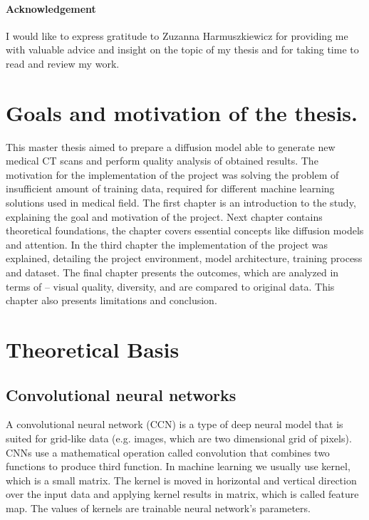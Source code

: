 \documentclass[11pt,a4paper]{report}
\begin{document}
\subsubsection{Acknowledgement}
I would like to express gratitude to Zuzanna Harmuszkiewicz for providing me with valuable advice and insight on the topic of my thesis and for taking time to read and review my work.
\newpage
\tableofcontents
\chapter{Goals and motivation of the thesis.}
This master thesis aimed to prepare a diffusion model able to generate new medical CT scans and perform quality analysis of obtained results. The motivation for the implementation of the project was solving the problem of insufficient amount of training data, required for different machine learning solutions used in medical field. 
The first chapter is an introduction to the study, explaining the goal and motivation of the project. 
Next chapter contains theoretical foundations, the chapter covers essential concepts like diffusion models and attention. 
In the third chapter the implementation of the project was explained, detailing the project environment, model architecture, training process and dataset.
The final chapter presents the outcomes, which are analyzed in terms of – visual quality, diversity, and are compared to original data. This chapter also presents limitations and conclusion.

\chapter{Theoretical Basis}

\section{Convolutional neural networks}
A convolutional neural network (CCN) is a type of deep neural model that is suited for grid-like data (e.g. images, which are two dimensional grid of pixels). CNNs use a mathematical operation called convolution that combines two functions to produce third function. In machine learning we usually use kernel, which is a small matrix. The kernel is moved in horizontal and vertical direction over the input data and applying kernel results in matrix, which is called feature map. The values of kernels are trainable neural network's parameters.
\cite{convolution} \cite{Michal}
\end{document}
